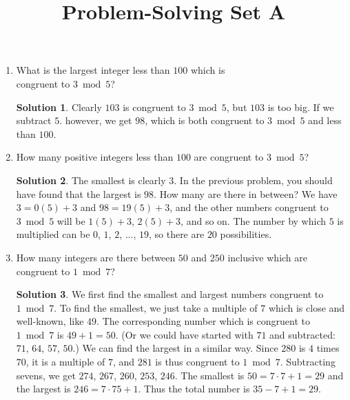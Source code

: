 \documentclass{article}
\title{Problem-Solving Set A}
\author{}
\date{}
\theoremstyle{definition}
\newtheorem*{solution}{Solution}
\begin{document}
\maketitle
\begin{multicols}{2}
    \begin{enumerate}
        \item What is the largest integer less than $100$ which is \\ congruent to $3\bmod 5$?
            \begin{solution}
                Clearly $103$ is congruent to $3 \bmod{5}$, but $103$ is too big. 
                If we subtract $5$. however, we get $98$, which is both congruent to $3 \bmod{5}$ and less than $100$. 
            \end{solution}
        \item How many positive integers less than $100$ are congruent to $3\bmod 5$?
            \begin{solution}
                The smallest is clearly $3$. In the previous problem, you should have found that the largest is $98$. 
                How many are there in between? 
                We have $3 = 0(5) + 3$ and $98 = 19(5) +3$, and the other numbers congruent to $3 \bmod{5}$ will be $1(5) + 3$, $2(5) + 3$, and so on. 
                The number by which $5$ is multiplied can be $0$, $1$, $2$, ..., $19$, so there are $20$ possibilities.
            \end{solution}
        \item How many integers are there between $50$ and $250$ inclusive which are congruent to $1\bmod 7$?
            \begin{solution}
                We first find the smallest and largest numbers congruent to $1 \bmod{7}$. 
                To find the smallest, we just take a multiple of $7$ which is close and well-known, like $49$. 
                The corresponding number which is congruent to $1 \bmod{7}$ is $49 + 1 = 50$. 
                (Or we could have started with $71$ and subtracted: $71$, $64$, $57$, $50$.) 
                We can find the largest in a similar way. 
                Since $280$ is $4$ times $70$, it is a multiple of $7$, and $281$ is thus congruent to $1 \bmod{7}$. 
                Subtracting sevens, we get $274$, $267$, $260$, $253$, $246$. 
                The smallest is $50 = 7 \cdot 7 + 1 = 29$ and the largest is $246 = 7 \cdot 75 + 1$. 
                Thus the total number is $35 - 7 + 1 = 29$.
            \end{solution}

\end{enumerate}
\end{multicols}
\end{document}
